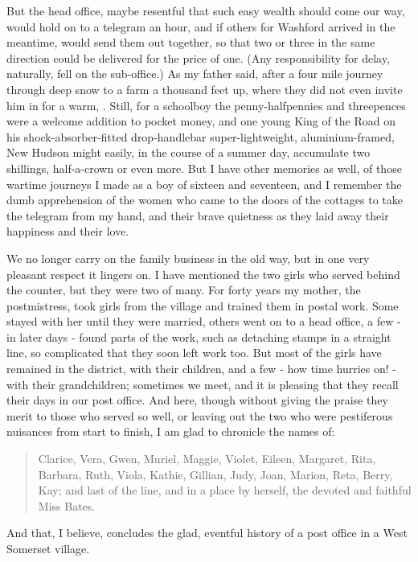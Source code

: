 But the head office, maybe resentful that such easy wealth should come our way, would hold on to a telegram an hour, and if others for Washford arrived in the meantime, would send them out together, so that two or three in the same direction could be delivered for the price of one. (Any responsibility for delay, naturally, fell on the sub-office.) As my father said, after a four mile journey through deep snow to a farm a thousand feet up, where they did not even invite him in for a warm, . Still, for a schoolboy the penny-halfpennies and threepences were a welcome addition to pocket money, and one young King of the Road on his shock-absorber-fitted drop-handlebar super-lightweight, aluminium-framed, New Hudson might easily, in the course of a summer day, accumulate two shillings, half-a-crown or even more. But I have other memories as well, of those wartime journeys I made as a boy of sixteen and seventeen, and I remember the dumb apprehension of the women who came to the doors of the cottages to take the telegram from my hand, and their brave quietness as they laid away their happiness and their love.

We no longer carry on the family business in the old way, but in one very pleasant respect it lingers on. I have mentioned the two girls who served behind the counter, but they were two of many. For forty years my mother, the postmistress, took girls from the village and trained them in postal work. Some stayed with her until they were married, others went on to a head office, a few - in later days - found parts of the work, such as detaching stamps in a straight line, so complicated that they soon left work too. But most of the girls have remained in the district, with their children, and a few - how time hurries on! - with their grandchildren; sometimes we meet, and it is pleasing that they recall their days in our post office. And here, though without giving the praise they merit to those who served so well, or leaving out the two who were pestiferous nuisances from start to finish, I am glad to chronicle the names of:

\begin{quote}
Clarice, Vera, Gwen, Muriel, Maggie, Violet, Eileen, Margaret, Rita, Barbara, Ruth, Viola, Kathie, Gillian, Judy, Joan, Marion, Reta, Berry, Kay;
and last of the line, and in a place by herself, the devoted and faithful Miss Bates.
\end{quote}

And that, I believe, concludes the glad, eventful history of a post office in a West Somerset village.

